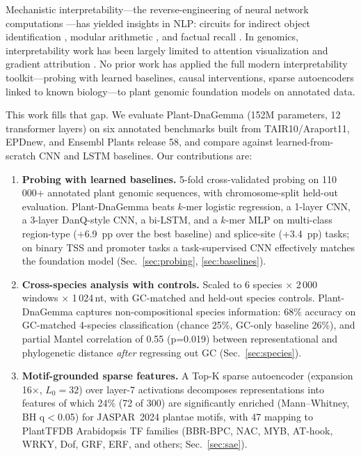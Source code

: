 \documentclass{article}
\begin{document}
Mechanistic interpretability---the reverse-engineering of neural network
computations \citep{elhage2022toy, olah2020zoom, conmy2023towards}---has
yielded insights in NLP: circuits for indirect object identification
\citep{wang2023interpretability}, modular arithmetic \citep{neel2023grokking},
and factual recall \citep{meng2022locating}. In genomics, interpretability
work has been largely limited to attention visualization and gradient
attribution \citep{clauwaert2021explainability, avsec2021effective,
yu2024plantrna}. No prior work has applied the full modern interpretability
toolkit---probing with learned baselines, causal interventions, sparse
autoencoders linked to known biology---to plant genomic foundation models
on annotated data.

This work fills that gap. We evaluate Plant-DnaGemma (152M parameters, 12
transformer layers) on six annotated benchmarks built from TAIR10/Araport11,
EPDnew, and Ensembl Plants release 58, and compare against
learned-from-scratch CNN and LSTM baselines. Our contributions are:

\begin{enumerate}
    \item \textbf{Probing with learned baselines.} 5-fold cross-validated
    probing on 110\,000+ annotated plant genomic sequences, with
    chromosome-split held-out evaluation. Plant-DnaGemma beats $k$-mer
    logistic regression, a 1-layer CNN, a 3-layer DanQ-style CNN, a bi-LSTM,
    and a $k$-mer MLP on multi-class region-type (+6.9~pp over the best
    baseline) and splice-site (+3.4~pp) tasks; on binary TSS and promoter
    tasks a task-supervised CNN effectively matches the foundation model
    (Sec.~\ref{sec:probing}, \ref{sec:baselines}).
    \item \textbf{Cross-species analysis with controls.} Scaled to 6 species
    $\times$ 2\,000 windows $\times$ 1\,024\,nt, with GC-matched and held-out
    species controls. Plant-DnaGemma captures non-compositional species
    information: 68\% accuracy on GC-matched 4-species classification (chance
    25\%, GC-only baseline 26\%), and partial Mantel correlation of 0.55
    (p=0.019) between representational and phylogenetic distance
    \emph{after} regressing out GC (Sec.~\ref{sec:species}).
    \item \textbf{Motif-grounded sparse features.} A Top-K sparse autoencoder
    (expansion 16$\times$, $L_0{=}32$) over layer-7 activations decomposes
    representations into features of which 24\% (72 of 300) are significantly
    enriched (Mann--Whitney, BH q$<$0.05) for JASPAR~2024 plantae motifs,
    with 47 mapping to PlantTFDB Arabidopsis TF families (BBR-BPC, NAC, MYB,
    AT-hook, WRKY, Dof, GRF, ERF, and others; Sec.~\ref{sec:sae}).
\end{enumerate}
\end{document}
